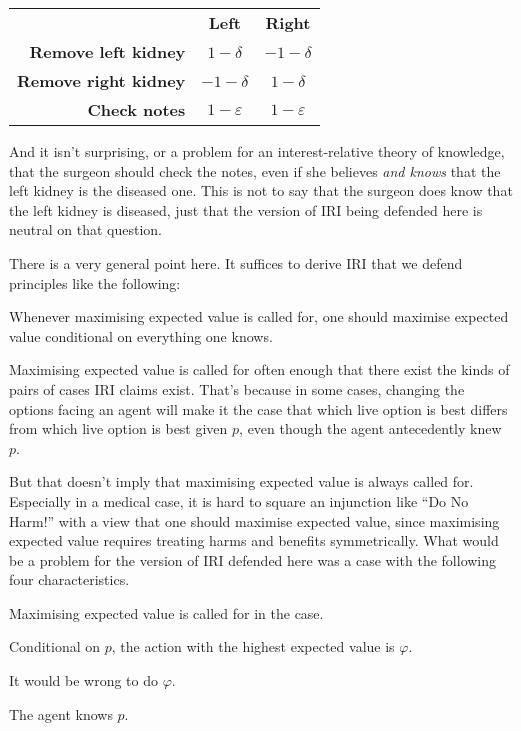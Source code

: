 \documentclass[oneside]{book}
\begin{document}
\begin{center}
\begin{tabular}{r c c}
 & \textbf{Left} & \textbf{Right} \\
\textbf{Remove left kidney} & $1-\delta$ & $-1-\delta$ \\
\textbf{Remove right kidney} & $-1-\delta$ & $1-\delta$ \\
\textbf{Check notes} & $1-\varepsilon$ & $1-\varepsilon$ \\
\end{tabular}
\end{center}

\noindent And it isn't surprising, or a problem for an interest-relative theory of knowledge, that the surgeon should check the notes, even if she believes \textit{and knows} that the left kidney is the diseased one. This is not to say that the surgeon does know that the left kidney is diseased, just that the version of IRI being defended here is neutral on that question.

There is a very general point here. It suffices to derive IRI that we defend principles like the following:

\begin{itemize*}
\item Whenever maximising expected value is called for, one should maximise expected value conditional on everything one knows.
\item Maximising expected value is called for often enough that there exist the kinds of pairs of cases IRI claims exist. That's because in some cases, changing the options facing an agent will make it the case that which live option is best differs from which live option is best given $p$, even though the agent antecedently knew $p$.
\end{itemize*}

\noindent But that doesn't imply that maximising expected value is always called for. Especially in a medical case, it is hard to square an injunction like ``Do No Harm!'' with a view that one should maximise expected value, since maximising expected value requires treating harms and benefits symmetrically. What would be a problem for the version of IRI defended here was a case with the following four characteristics.

\begin{itemize*}
\item Maximising expected value is called for in the case.
\item Conditional on $p$, the action with the highest expected value is $\varphi$.
\item It would be wrong to do $\varphi$.
\item The agent knows $p$.
\end{itemize*}
\end{document}
